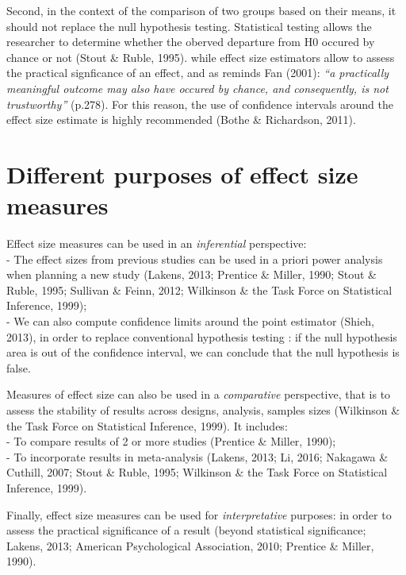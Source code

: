 \documentclass[
  man,floatsintext]{apa6}
\begin{document}
Second, in the context of the comparison of two groups based on their means, it should not replace the null hypothesis testing. Statistical testing allows the researcher to determine whether the oberved departure from H0 occured by chance or not (Stout \& Ruble, 1995). while effect size estimators allow to assess the practical signficance of an effect, and as reminds Fan (2001): \emph{\enquote{a practically meaningful outcome may also have occured by chance, and consequently, is not trustworthy}} (p.278). For this reason, the use of confidence intervals around the effect size estimate is highly recommended (Bothe \& Richardson, 2011).

\hypertarget{different-purposes-of-effect-size-measures}{%
\section{Different purposes of effect size measures}\label{different-purposes-of-effect-size-measures}}

Effect size measures can be used in an \emph{inferential} perspective:\\
- The effect sizes from previous studies can be used in a priori power analysis when planning a new study (Lakens, 2013; Prentice \& Miller, 1990; Stout \& Ruble, 1995; Sullivan \& Feinn, 2012; Wilkinson \& the Task Force on Statistical Inference, 1999);\\
- We can also compute confidence limits around the point estimator (Shieh, 2013), in order to replace conventional hypothesis testing : if the null hypothesis area is out of the confidence interval, we can conclude that the null hypothesis is false.

Measures of effect size can also be used in a \emph{comparative} perspective, that is to assess the stability of results across designs, analysis, samples sizes (Wilkinson \& the Task Force on Statistical Inference, 1999). It includes:\\
- To compare results of 2 or more studies (Prentice \& Miller, 1990);\\
- To incorporate results in meta-analysis (Lakens, 2013; Li, 2016; Nakagawa \& Cuthill, 2007; Stout \& Ruble, 1995; Wilkinson \& the Task Force on Statistical Inference, 1999).

Finally, effect size measures can be used for \emph{interpretative} purposes: in order to assess the practical significance of a result (beyond statistical significance; Lakens, 2013; American Psychological Association, 2010; Prentice \& Miller, 1990).
\end{document}
